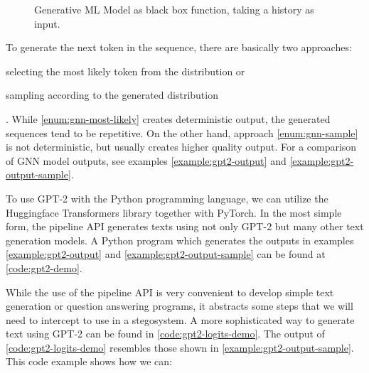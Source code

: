 \begin{figure}[htpb]
	\centering
	\caption{Generative ML Model as black box function, taking a history as input.}
	\label{fig:generative-network}
\end{figure}
To generate the next token in the sequence, there are basically two approaches:
\begin{enumerate*}[label=(\roman*)] \item \label{enum:gnn-most-likely} selecting the most likely token from the distribution or \item \label{enum:gnn-sample} sampling according to the generated distribution \end{enumerate*}.
While \ref{enum:gnn-most-likely} creates deterministic output, the generated sequences tend to be repetitive.
On the other hand, approach \ref{enum:gnn-sample} is not deterministic, but usually creates higher quality output.
For a comparison of GNN model outputs, see examples \ref{example:gpt2-output} and \ref{example:gpt2-output-sample}.

To use GPT-2 with the Python programming language, we can utilize the Huggingface Transformers library together with PyTorch.
In the most simple form, the pipeline API generates texts using not only GPT-2 but many other text generation models.
A Python program which generates the outputs in examples \ref{example:gpt2-output} and \ref{example:gpt2-output-sample} can be found at \autoref{code:gpt2-demo}.

While the use of the pipeline API is very convenient to develop simple text generation or question answering programs, it abstracts some steps that we will need to intercept to use in a stegosystem.
A more sophisticated way to generate text using GPT-2 can be found in \autoref{code:gpt2-logits-demo}.
The output of \autoref{code:gpt2-logits-demo} resembles those shown in \autoref{example:gpt2-output-sample}. 
This code example shows how we can:

